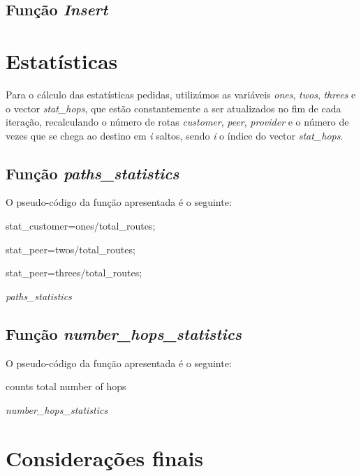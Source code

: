 \documentclass[a4paper]{article}
\begin{document}
\subsection{Função \textit{Insert}}

\section{Estatísticas}
Para o cálculo das estatísticas pedidas, utilizámos as variáveis \textit{ones}, \textit{twos}, \textit{threes} e o vector \textit{stat\_hops}, que estão constantemente a ser atualizados no fim de cada iteração, recalculando o número de rotas \textit{customer}, \textit{peer}, \textit{provider} e o número de vezes que se chega ao destino em \textit{i} saltos, sendo \textit{i} o índice do vector \textit{stat\_hops}.
\subsection{Função \textit{paths\_statistics}}
O pseudo-código da função apresentada é o seguinte:

\begin{algorithm}[H]
  stat\_customer=ones/total\_routes;
  
  stat\_peer=twos/total\_routes;
  
  stat\_peer=threes/total\_routes;
 \caption{\textit{paths\_statistics}}
\end{algorithm}
\subsection{Função \textit{number\_hops\_statistics}}
O pseudo-código da função apresentada é o seguinte:

\begin{algorithm}[H]
 counts total number of hops\;
 
 
 \caption{\textit{number\_hops\_statistics}}
\end{algorithm}
\section{Considerações finais}
\end{document}
